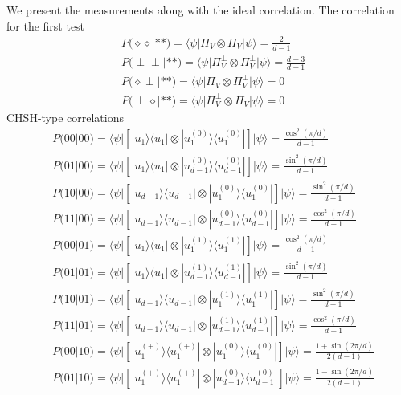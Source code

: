 \documentclass[11pt,letterpaper]{article}
\newcommand{\ket}[1]{|#1\rangle}
\newcommand{\bra}[1]{\langle#1|}
\newcommand{\ketbra}[2]{|#1\rangle\langle#2|}
\newcommand{\1}{\mathbb{1}}
\theoremstyle{definition}
\begin{document}
We present the measurements along with the ideal correlation.
The correlation for the first test
\begin{align}
	&P(\diamond \diamond| \ast \ast) = \bra{\psi} \Pi_V \otimes \Pi_V \ket{\psi} = \frac{2}{d-1}\\
	&P(\perp \perp| \ast \ast) = \bra{\psi} \Pi_V^\perp \otimes \Pi_V^\perp \ket{\psi} = \frac{d-3}{d-1}\\
	&P(\diamond \perp| \ast \ast) = \bra{\psi} \Pi_V \otimes \Pi_V^\perp \ket{\psi} = 0\\
	&P(\perp \diamond| \ast \ast) = \bra{\psi} \Pi_V^\perp \otimes \Pi_V \ket{\psi} = 0
\end{align}
CHSH-type correlations
\begin{align}
	&P(00|00) = \bra{\psi}  \left[\ketbra{u_1}{u_1}\otimes \ketbra{u_1^{(0)}}{u_1^{(0)}}\right]\ket{\psi} = \frac{\cos^2(\pi/d)}{d-1}\\
	&P(01|00) = \bra{\psi}  \left[\ketbra{u_1}{u_1}\otimes \ketbra{u_{d-1}^{(0)}}{u_{d-1}^{(0)}}\right]\ket{\psi} = \frac{\sin^2(\pi/d)}{d-1}\\
	&P(10|00) = \bra{\psi}  \left[\ketbra{u_{d-1}}{u_{d-1}}\otimes \ketbra{u_1^{(0)}}{u_1^{(0)}}\right]\ket{\psi} = \frac{\sin^2(\pi/d)}{d-1}\\
	&P(11|00) = \bra{\psi}  \left[\ketbra{u_{d-1}}{u_{d-1}}\otimes \ketbra{u_{d-1}^{(0)}}{u_{d-1}^{(0)}}\right]\ket{\psi} = \frac{\cos^2(\pi/d)}{d-1}\\
	&P(00|01) = \bra{\psi}  \left[\ketbra{u_1}{u_1}\otimes \ketbra{u_1^{(1)}}{u_1^{(1)}}\right]\ket{\psi} = \frac{\cos^2(\pi/d)}{d-1}\\
	&P(01|01) = \bra{\psi}  \left[\ketbra{u_1}{u_1}\otimes \ketbra{u_{d-1}^{(1)}}{u_{d-1}^{(1)}}\right]\ket{\psi} = \frac{\sin^2(\pi/d)}{d-1}\\
	&P(10|01) = \bra{\psi}  \left[\ketbra{u_{d-1}}{u_{d-1}}\otimes \ketbra{u_1^{(1)}}{u_1^{(1)}}\right]\ket{\psi} = \frac{\sin^2(\pi/d)}{d-1}\\
	&P(11|01) = \bra{\psi}  \left[\ketbra{u_{d-1}}{u_{d-1}}\otimes \ketbra{u_{d-1}^{(1)}}{u_{d-1}^{(1)}}\right]\ket{\psi} = \frac{\cos^2(\pi/d)}{d-1}\\
	&P(00|10) = \bra{\psi}  \left[\ketbra{u_1^{(+)}}{u_1^{(+)}}\otimes \ketbra{u_1^{(0)}}{u_1^{(0)}}\right]\ket{\psi} = \frac{1+\sin(2\pi/d)}{2(d-1)}\\
	&P(01|10) = \bra{\psi}  \left[\ketbra{u_1^{(+)}}{u_1^{(+)}}\otimes \ketbra{u_{d-1}^{(0)}}{u_{d-1}^{(0)}}\right]\ket{\psi} = \frac{1-\sin(2\pi/d)}{2(d-1)}\\

\end{align}
\end{document}
